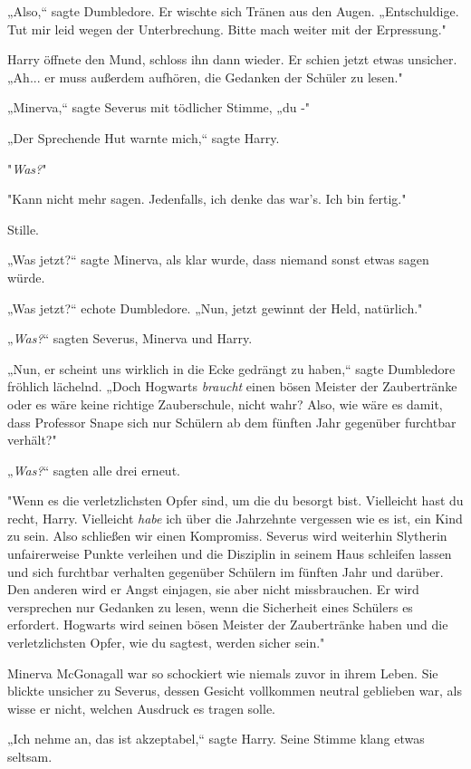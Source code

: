 {„Also,“ sagte Dumbledore. Er wischte sich Tränen aus den Augen. „Entschuldige. Tut mir leid wegen der Unterbrechung. Bitte mach weiter mit der Erpressung."

Harry öffnete den Mund, schloss ihn dann wieder. Er schien jetzt etwas unsicher. „Ah... er muss außerdem aufhören, die Gedanken der Schüler zu lesen."

„Minerva,“ sagte Severus mit tödlicher Stimme, „du -"

„Der Sprechende Hut warnte mich,“ sagte Harry.

"\emph{Was?}"

"Kann nicht mehr sagen. Jedenfalls, ich denke das war's. Ich bin fertig."

Stille.

„Was jetzt?“ sagte Minerva, als klar wurde, dass niemand sonst etwas sagen würde.

„Was jetzt?“ echote Dumbledore. „Nun, jetzt gewinnt der Held, natürlich."

„\emph{Was?}“ sagten Severus, Minerva und Harry.

„Nun, er scheint uns wirklich in die Ecke gedrängt zu haben,“ sagte Dumbledore fröhlich lächelnd. „Doch Hogwarts \emph{braucht} einen bösen Meister der Zaubertränke oder es wäre keine richtige Zauberschule, nicht wahr? Also, wie wäre es damit, dass Professor Snape sich nur Schülern ab dem fünften Jahr gegenüber furchtbar verhält?"

„\emph{Was?}“ sagten alle drei erneut.

"Wenn es die verletzlichsten Opfer sind, um die du besorgt bist. Vielleicht hast du recht, Harry. Vielleicht \emph{habe} ich über die Jahrzehnte vergessen wie es ist, ein Kind zu sein. Also schließen wir einen Kompromiss. Severus wird weiterhin Slytherin unfairerweise Punkte verleihen und die Disziplin in seinem Haus schleifen lassen und sich furchtbar verhalten gegenüber Schülern im fünften Jahr und darüber. Den anderen wird er Angst einjagen, sie aber nicht missbrauchen. Er wird versprechen nur Gedanken zu lesen, wenn die Sicherheit eines Schülers es erfordert. Hogwarts wird seinen bösen Meister der Zaubertränke haben und die verletzlichsten Opfer, wie du sagtest, werden sicher sein."

Minerva McGonagall war so schockiert wie niemals zuvor in ihrem Leben. Sie blickte unsicher zu Severus, dessen Gesicht vollkommen neutral geblieben war, als wisse er nicht, welchen Ausdruck es tragen solle.

„Ich nehme an, das ist akzeptabel,“ sagte Harry. Seine Stimme klang etwas seltsam.

}
